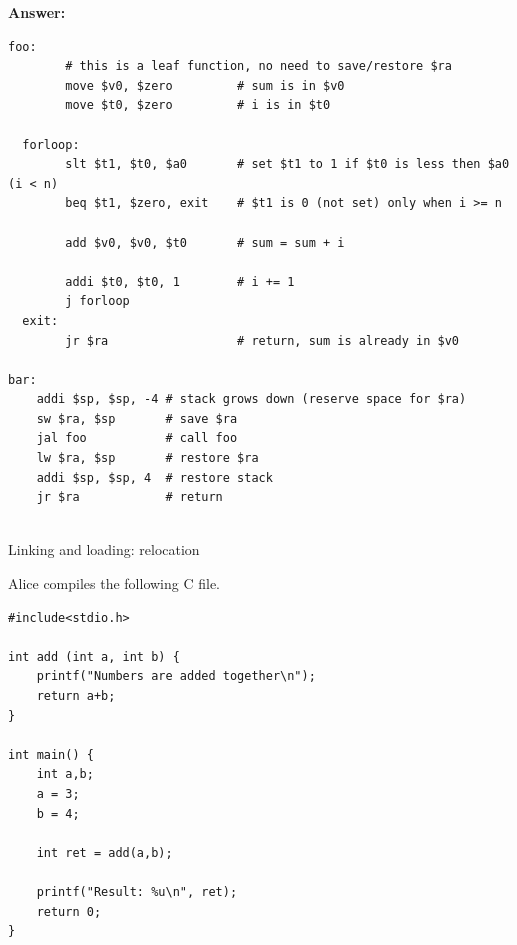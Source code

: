 \documentclass[11pt]{exam}
\begin{document}
\begin{questions}
\begin{parts}
\begin{verbatim}
\end{verbatim}

\textbf{Answer:} 

\begin{verbatim}
foo: 
        # this is a leaf function, no need to save/restore $ra
        move $v0, $zero         # sum is in $v0
        move $t0, $zero         # i is in $t0

  forloop:
        slt $t1, $t0, $a0       # set $t1 to 1 if $t0 is less then $a0 (i < n)
        beq $t1, $zero, exit    # $t1 is 0 (not set) only when i >= n

        add $v0, $v0, $t0       # sum = sum + i

        addi $t0, $t0, 1        # i += 1
        j forloop
  exit:
        jr $ra                  # return, sum is already in $v0  

bar: 
    addi $sp, $sp, -4 # stack grows down (reserve space for $ra)
    sw $ra, $sp       # save $ra
    jal foo           # call foo
    lw $ra, $sp       # restore $ra
    addi $sp, $sp, 4  # restore stack
    jr $ra            # return
    
\end{verbatim}


\vfill

\end{parts}

\newpage

\addpoints 

\question Linking and loading: relocation

Alice compiles the following C file. 

\begin{verbatim}
#include<stdio.h>

int add (int a, int b) {
    printf("Numbers are added together\n");
    return a+b;
}

int main() {
    int a,b;
    a = 3;
    b = 4;

    int ret = add(a,b);

    printf("Result: %u\n", ret);
    return 0; 
}
\end{verbatim}


\end{questions}
\end{document}
